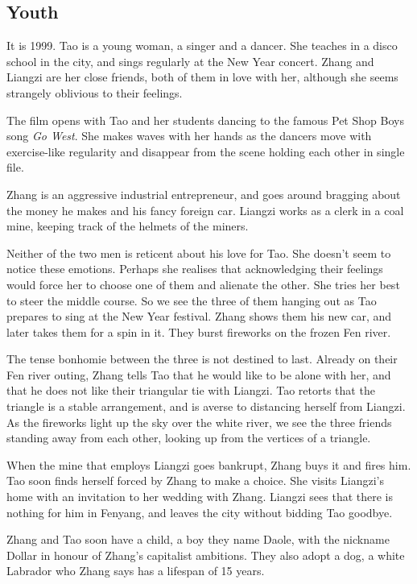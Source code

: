 \documentclass{article}
\begin{document}
\subsection{Youth}
\label{sec:jfdg3q3z}

It is 1999.  Tao is a young woman, a singer and a dancer.  She teaches
in a disco school in the city, and sings regularly at the New Year
concert.  Zhang and Liangzi are her close friends, both of them in
love with her, although she seems strangely oblivious to their
feelings.

The film opens with Tao and her students dancing to the famous Pet
Shop Boys song \emph{Go West}.  She makes waves with her hands as the
dancers move with exercise-like regularity and disappear from the
scene holding each other in single file.

Zhang is an aggressive industrial entrepreneur, and goes around
bragging about the money he makes and his fancy foreign car.  Liangzi
works as a clerk in a coal mine, keeping track of the helmets of the
miners.

Neither of the two men is reticent about his love for Tao.  She
doesn't seem to notice these emotions.  Perhaps she realises that
acknowledging their feelings would force her to choose one of them and
alienate the other.  She tries her best to steer the middle course.
So we see the three of them hanging out as Tao prepares to sing at the
New Year festival.  Zhang shows them his new car, and later takes them
for a spin in it.  They burst fireworks on the frozen Fen river.

The tense bonhomie between the three is not destined to last.  Already
on their Fen river outing, Zhang tells Tao that he would like to be
alone with her, and that he does not like their triangular tie with
Liangzi.  Tao retorts that the triangle is a stable arrangement, and
is averse to distancing herself from Liangzi.  As the fireworks light
up the sky over the white river, we see the three friends standing
away from each other, looking up from the vertices of a triangle.

When the mine that employs Liangzi goes bankrupt, Zhang buys it and
fires him.  Tao soon finds herself forced by Zhang to make a choice.
She visits Liangzi's home with an invitation to her wedding with
Zhang.  Liangzi sees that there is nothing for him in Fenyang, and
leaves the city without bidding Tao goodbye.

Zhang and Tao soon have a child, a boy they name Daole, with the
nickname Dollar in honour of Zhang's capitalist ambitions.  They also
adopt a dog, a white Labrador who Zhang says has a lifespan of 15
years.
\end{document}
